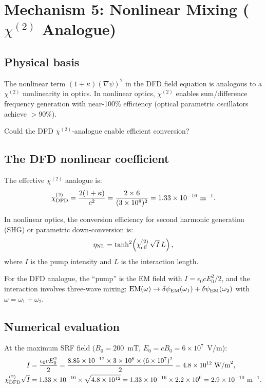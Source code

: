 \documentclass[11pt]{article}
\newcommand{\ee}[1]{\times 10^{#1}}
\newcommand{\dpsiEM}{\delta\psi_{\rm EM}}
\begin{document}
\section{Mechanism 5: Nonlinear Mixing ($\chi^{(2)}$ Analogue)}
\label{sec:mech-nonlinear}

\subsection{Physical basis}

The nonlinear term $(1+\kappa)(\nabla\psi)^2$ in the DFD field equation
is analogous to a $\chi^{(2)}$ nonlinearity in optics. In nonlinear
optics, $\chi^{(2)}$ enables sum/difference frequency generation with
near-100\% efficiency (optical parametric oscillators achieve $>$90\%).

Could the DFD $\chi^{(2)}$-analogue enable efficient conversion?

\subsection{The DFD nonlinear coefficient}

The effective $\chi^{(2)}$ analogue is:
\begin{equation}
\chi_{\rm DFD}^{(2)} = \frac{2(1+\kappa)}{c^2}
= \frac{2\times 6}{(3\ee{8})^2} = 1.33\ee{-16}~\text{m}^{-1}.
\label{eq:chi2-DFD}
\end{equation}

In nonlinear optics, the conversion efficiency for second harmonic
generation (SHG) or parametric down-conversion is:
\begin{equation}
\eta_{\rm NL} = \tanh^2\!\left(\chi^{(2)}_{\rm eff}\,\sqrt{I}\,L\right),
\end{equation}
where $I$ is the pump intensity and $L$ is the interaction length.

For the DFD analogue, the ``pump'' is the EM field with
$I = \epsilon_0 c E_0^2/2$, and the interaction involves three-wave
mixing: $\text{EM}(\omega) \to \dpsiEM(\omega_1) + \dpsiEM(\omega_2)$
with $\omega = \omega_1 + \omega_2$.

\subsection{Numerical evaluation}

At the maximum SRF field ($B_0 = 200$~mT, $E_0 = cB_0 = 6\ee{7}$~V/m):
\begin{align}
I &= \frac{\epsilon_0 c E_0^2}{2}
= \frac{8.85\ee{-12}\times 3\ee{8}\times(6\ee{7})^2}{2}
= 4.8\ee{12}~\text{W/m}^2, \\
\chi_{\rm DFD}^{(2)}\sqrt{I} &= 1.33\ee{-16}\times\sqrt{4.8\ee{12}}
= 1.33\ee{-16}\times 2.2\ee{6} = 2.9\ee{-10}~\text{m}^{-1}.
\end{align}
\end{document}
